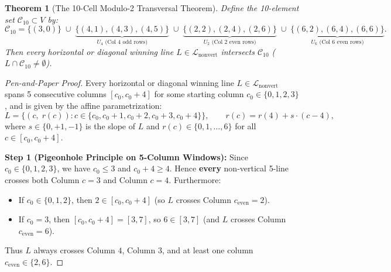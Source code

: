 \documentclass[11pt,reqno]{amsart}
\theoremstyle{plain}
\newtheorem{theorem}{Theorem}[section]
\theoremstyle{definition}
\theoremstyle{remark}
\begin{document}
\begin{theorem}[The 10-Cell Modulo-2 Transversal Theorem]
\label{thm:erdos_10cell}
Define the 10-element set $\mathcal{C}_{10} \subset V$ by:
\begin{equation}
\mathcal{C}_{10} = \{(3,0)\} \;\cup\; \underbrace{\{(4,1),(4,3),(4,5)\}}_{U_4 \text{ (Col 4 odd rows)}} \;\cup\; \underbrace{\{(2,2),(2,4),(2,6)\}}_{U_2 \text{ (Col 2 even rows)}} \;\cup\; \underbrace{\{(6,2),(6,4),(6,6)\}}_{U_6 \text{ (Col 6 even rows)}}.
\end{equation}
Then every horizontal or diagonal winning line $L \in \mathcal{L}_{\text{nonvert}}$ intersects $\mathcal{C}_{10}$ ($L \cap \mathcal{C}_{10} \ne \emptyset$).
\end{theorem}

\begin{proof}[Pen-and-Paper Proof]
Every horizontal or diagonal winning line $L \in \mathcal{L}_{\text{nonvert}}$ spans 5 consecutive columns $[c_0, c_0+4]$ for some starting column $c_0 \in \{0, 1, 2, 3\}$, and is given by the affine parametrization:
\begin{equation}
L = \{(c,\; r(c)) : c \in \{c_0, c_0+1, c_0+2, c_0+3, c_0+4\}\}, \qquad r(c) = r(4) + s \cdot (c - 4),
\end{equation}
where $s \in \{0, +1, -1\}$ is the slope of $L$ and $r(c) \in \{0, 1, \dots, 6\}$ for all $c \in [c_0, c_0+4]$.

\textbf{Step 1 (Pigeonhole Principle on 5-Column Windows):}
Since $c_0 \in \{0, 1, 2, 3\}$, we have $c_0 \le 3$ and $c_0 + 4 \ge 4$. Hence \textbf{every} non-vertical 5-line crosses both Column $c = 3$ and Column $c = 4$. Furthermore:
\begin{itemize}
    \item If $c_0 \in \{0, 1, 2\}$, then $2 \in [c_0, c_0+4]$ (so $L$ crosses Column $c_{\text{even}} = 2$).
    \item If $c_0 = 3$, then $[c_0, c_0+4] = [3, 7]$, so $6 \in [3, 7]$ (and $L$ crosses Column $c_{\text{even}} = 6$).
\end{itemize}
Thus $L$ always crosses Column $4$, Column $3$, and at least one column $c_{\text{even}} \in \{2, 6\}$.


\end{proof}
\end{document}
